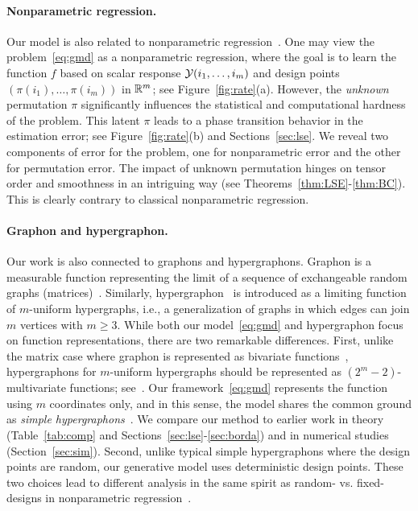 \documentclass[12pt]{article}
\theoremstyle{definition}
\begin{document}
\paragraph{Nonparametric regression.} Our model is also related to nonparametric regression~\cite{tsybakov2009introduction}. One may view the problem~\eqref{eq:gmd} as a nonparametric regression, where the goal is to learn the function $f$ based on scalar response $\mathcal{Y}(i_1,\ldots,i_m)$ and design points $(\pi({i_1}),\ldots,\pi({i_m}))$ in $\mathbb{R}^m$; see Figure~\ref{fig:rate}(a). However, the \emph{unknown} permutation $\pi$ significantly influences the statistical and computational hardness of the problem. This latent $\pi$ leads to a phase transition behavior in the estimation error; see Figure~\ref{fig:rate}(b) and Sections~\ref{sec:lse}. We reveal  two components of error for the problem, one for nonparametric error and the other for permutation error. The impact of unknown permutation hinges on tensor order and smoothness in an intriguing way (see Theorems~\ref{thm:LSE}-\ref{thm:BC}). This is clearly contrary to classical nonparametric regression. 

\paragraph{Graphon and hypergraphon.} Our work is also connected to graphons and hypergraphons. Graphon is a measurable function representing the limit of a sequence of exchangeable random graphs (matrices)~\cite{klopp2017oracle,gao2015rate,chan2014consistent}. Similarly, hypergraphon~\cite{zhao2015hypergraph,lovasz2012large} is introduced as a limiting function of $m$-uniform hypergraphs, i.e., a generalization of graphs in which edges can join $m$ vertices with $m\geq 3$. While both our model~\eqref{eq:gmd} and hypergraphon focus on function representations, there are two remarkable differences. First, unlike the matrix case where graphon is represented as bivariate functions~\citep{lovasz2012large}, hypergraphons for $m$-uniform hypergraphs should be represented as $(2^m-2)$-multivariate functions; see~\citet[Section 1.2]{zhao2015hypergraph}. Our framework~\eqref{eq:gmd} represents the function using $m$ coordinates only, and in this sense, the model shares the common ground as \emph{simple hypergraphons}~\citep{balasubramanian2021nonparametric}. We compare our method to earlier work in theory (Table~\ref{tab:comp} and Sections~\ref{sec:lse}-\ref{sec:borda}) and in numerical studies (Section~\ref{sec:sim}). Second, unlike typical simple hypergraphons where the design points are random, our generative model uses deterministic design points. These two choices lead to different analysis in the same spirit as random- vs. fixed-designs in nonparametric regression~\cite{wasserman2006all,tsybakov2009introduction}. 
\end{document}
